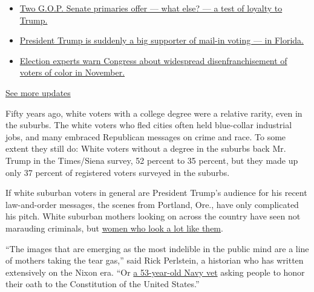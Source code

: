 \begin{itemize}
\tightlist
\item
  \href{https://www.nytimes3xbfgragh.onion/2020/08/04/us/elections/primary-election-michigan-arizona-kansas.html?action=click\&pgtype=Article\&state=default\&region=MAIN_CONTENT_1\&context=storylines_live_updates\#link-3924dd44}{Two
  G.O.P. Senate primaries offer --- what else? --- a test of loyalty to
  Trump.}
\item
  \href{https://www.nytimes3xbfgragh.onion/2020/08/04/us/elections/primary-election-michigan-arizona-kansas.html?action=click\&pgtype=Article\&state=default\&region=MAIN_CONTENT_1\&context=storylines_live_updates\#link-32b39e33}{President
  Trump is suddenly a big supporter of mail-in voting --- in Florida.}
\item
  \href{https://www.nytimes3xbfgragh.onion/2020/08/04/us/elections/primary-election-michigan-arizona-kansas.html?action=click\&pgtype=Article\&state=default\&region=MAIN_CONTENT_1\&context=storylines_live_updates\#link-6d019753}{Election
  experts warn Congress about widespread disenfranchisement of voters of
  color in November.}
\end{itemize}

\href{https://www.nytimes3xbfgragh.onion/2020/08/04/us/elections/primary-election-michigan-arizona-kansas.html?action=click\&pgtype=Article\&state=default\&region=MAIN_CONTENT_1\&context=storylines_live_updates}{See
more updates}

Fifty years ago, white voters with a college degree were a relative
rarity, even in the suburbs. The white voters who fled cities often held
blue-collar industrial jobs, and many embraced Republican messages on
crime and race. To some extent they still do: White voters without a
degree in the suburbs back Mr. Trump in the Times/Siena survey, 52
percent to 35 percent, but they made up only 37 percent of registered
voters surveyed in the suburbs.

If white suburban voters in general are President Trump's audience for
his recent law-and-order messages, the scenes from Portland, Ore., have
only complicated his pitch. White suburban mothers looking on across the
country have seen not marauding criminals, but
\href{https://www.nytimes3xbfgragh.onion/2020/07/27/parenting/wall-of-moms-protests.html?action=click\&module=Top\%20Stories\&pgtype=Homepage}{women
who look a lot like them}.

``The images that are emerging as the most indelible in the public mind
are a line of mothers taking the tear gas,'' said Rick Perlstein, a
historian who has written extensively on the Nixon era. ``Or
\href{https://www.nytimes3xbfgragh.onion/2020/07/20/us/portland-protests-navy-christopher-david.html}{a
53-year-old Navy vet} asking people to honor their oath to the
Constitution of the United States.''

